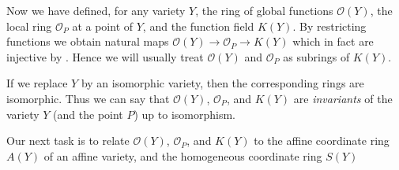 {Now we have defined, for any variety $Y$, the ring of global functions $\mathcal O(Y)$, the local ring $\mathcal O_P$ at a point of $Y$, and the function field $K(Y)$. By restricting functions we obtain natural maps $\mathcal O(Y)\to\mathcal O_P\to K(Y)$ which in fact are injective by . Hence we will usually treat $\mathcal O(Y)$ and $\mathcal O_P$ as subrings of $K(Y)$.

If we replace $Y$ by an isomorphic variety, then the corresponding rings are isomorphic. Thus we can say that $\mathcal O(Y)$, $\mathcal O_P$, and $K(Y)$ are \emph{invariants} of the variety $Y$ (and the point $P$) up to isomorphism.

Our next task is to relate $\mathcal O(Y)$, $\mathcal O_P$, and $K(Y)$ to the affine coordinate ring $A(Y)$ of an affine variety, and the homogeneous coordinate ring $S(Y)$%
}
